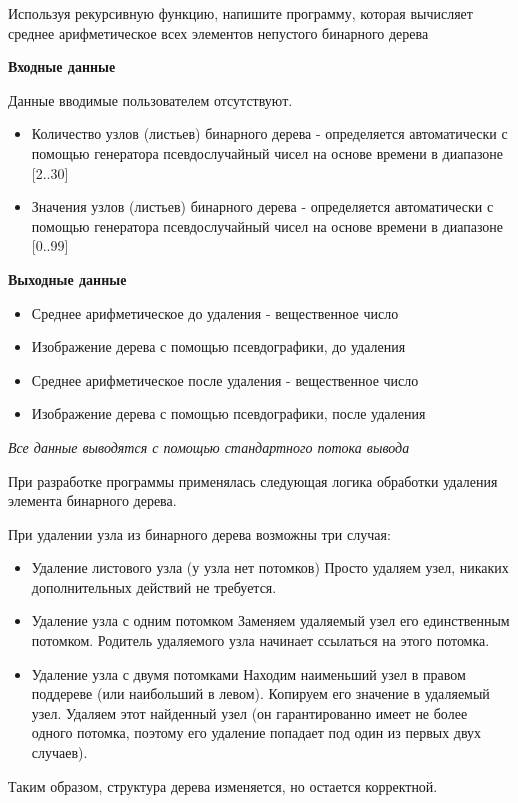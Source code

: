 \documentclass[a4paper,12pt]{article}
\begin{document}
	Используя рекурсивную функцию, напишите программу, которая вычисляет среднее арифметическое всех элементов непустого бинарного дерева
	
	\textbf{Входные данные}
	
	Данные вводимые пользователем отсутствуют.
	
	\begin{itemize}
		\item Количество узлов (листьев) бинарного дерева - определяется автоматически с помощью генератора псевдослучайный чисел на основе времени в диапазоне [2..30]
		\item Значения узлов (листьев) бинарного дерева - определяется автоматически с помощью генератора псевдослучайный чисел на основе времени в диапазоне [0..99]
	\end{itemize} 
	
	\textbf{Выходные данные}
	
	\begin{itemize}
		\item Среднее арифметическое до удаления - вещественное число
		\item Изображение дерева с помощью псевдографики, до удаления
		\item Среднее арифметическое после удаления - вещественное число
		\item Изображение дерева с помощью псевдографики, после удаления
		
	\end{itemize} 

	\textit{Все данные выводятся с помощью стандартного потока вывода}	
	
	При разработке программы применялась следующая логика обработки удаления элемента бинарного дерева.
	
	При удалении узла из бинарного дерева возможны три случая:
	
	\begin{itemize}
		\item Удаление листового узла (у узла нет потомков) \newline
	Просто удаляем узел, никаких дополнительных действий не требуется.
		\item Удаление узла с одним потомком \newline
	Заменяем удаляемый узел его единственным потомком. \newline
	Родитель удаляемого узла начинает ссылаться на этого потомка.
			\item 	Удаление узла с двумя потомками \newline
	Находим наименьший узел в правом поддереве (или наибольший в левом). \newline
	Копируем его значение в удаляемый узел. \newline
	Удаляем этот найденный узел (он гарантированно имеет не более одного потомка, поэтому его удаление попадает под один из первых двух случаев). \newline
	\end{itemize}
	Таким образом, структура дерева изменяется, но остается корректной. 
\end{document}
